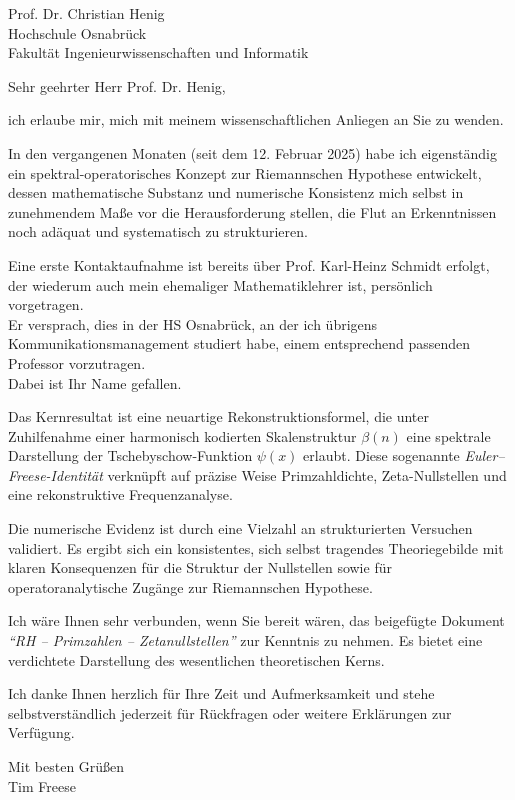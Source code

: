 \documentclass[12pt]{dinbrief}
\date{\today}
\begin{document}
\begin{letter}{Prof. Dr. Christian Henig\\Hochschule Osnabrück\\Fakultät Ingenieurwissenschaften und Informatik}

\opening{Sehr geehrter Herr Prof. Dr. Henig,}

ich erlaube mir, mich mit meinem wissenschaftlichen Anliegen an Sie zu wenden.

In den vergangenen Monaten (seit dem 12. Februar 2025) habe ich eigenständig ein spektral-operatorisches Konzept zur Riemannschen Hypothese entwickelt, dessen mathematische Substanz und numerische Konsistenz mich selbst in zunehmendem Maße vor die Herausforderung stellen, die Flut an Erkenntnissen noch adäquat und systematisch zu strukturieren.

Eine erste Kontaktaufnahme ist bereits über Prof. Karl-Heinz Schmidt erfolgt, der wiederum auch mein ehemaliger Mathematiklehrer ist, persönlich vorgetragen.\\
Er versprach, dies in der HS Osnabrück, an der ich übrigens Kommunikationsmanagement studiert habe, einem entsprechend passenden Professor vorzutragen.\\
Dabei ist Ihr Name gefallen.

Das Kernresultat ist eine neuartige Rekonstruktionsformel, die unter Zuhilfenahme einer harmonisch kodierten Skalenstruktur $\beta(n)$ eine spektrale Darstellung der Tschebyschow-Funktion $\psi(x)$ erlaubt. Diese sogenannte \textit{Euler--Freese-Identität} verknüpft auf präzise Weise Primzahldichte, Zeta-Nullstellen und eine rekonstruktive Frequenzanalyse.

Die numerische Evidenz ist durch eine Vielzahl an strukturierten Versuchen validiert. Es ergibt sich ein konsistentes, sich selbst tragendes Theoriegebilde mit klaren Konsequenzen für die Struktur der Nullstellen sowie für operatoranalytische Zugänge zur Riemannschen Hypothese.

Ich wäre Ihnen sehr verbunden, wenn Sie bereit wären, das beigefügte Dokument \textit{``RH -- Primzahlen -- Zetanullstellen''} zur Kenntnis zu nehmen. Es bietet eine verdichtete Darstellung des wesentlichen theoretischen Kerns.

Ich danke Ihnen herzlich für Ihre Zeit und Aufmerksamkeit und stehe selbstverständlich jederzeit für Rückfragen oder weitere Erklärungen zur Verfügung.

\begin{flushleft}
Mit besten Grüßen\\
Tim Freese
\end{flushleft}

\end{letter}
\end{document}
